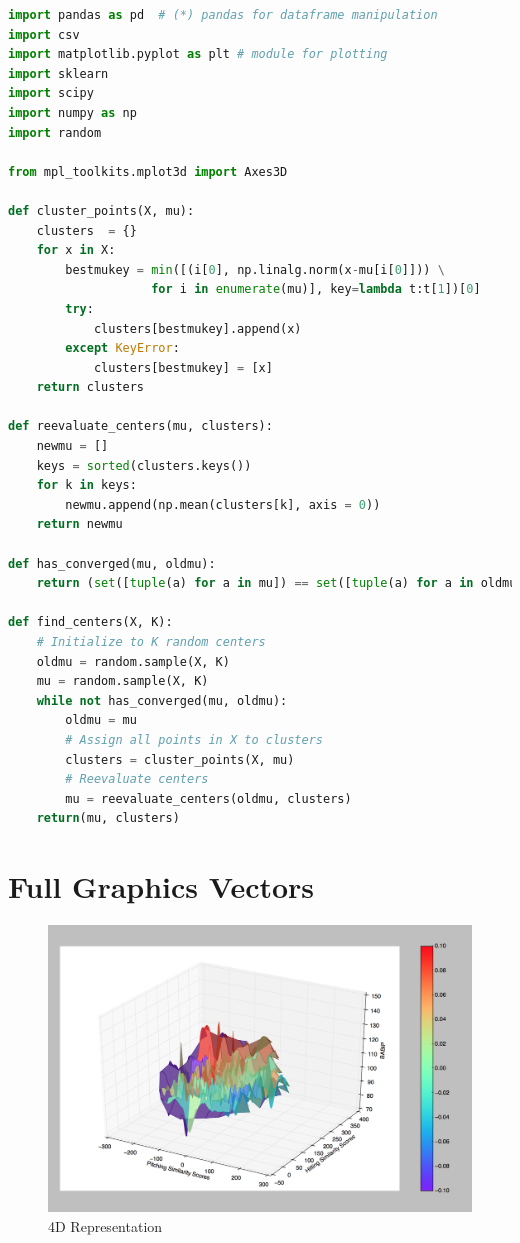 \documentclass[12pt]{article}
\numberwithin{equation}{subsection}
\begin{document}
\bigskip
{}
\begin{lstlisting}[language=Python, caption=K-means Clustering]
import pandas as pd  # (*) pandas for dataframe manipulation
import csv
import matplotlib.pyplot as plt # module for plotting 
import sklearn
import scipy
import numpy as np
import random

from mpl_toolkits.mplot3d import Axes3D

def cluster_points(X, mu):
    clusters  = {}
    for x in X:
        bestmukey = min([(i[0], np.linalg.norm(x-mu[i[0]])) \
                    for i in enumerate(mu)], key=lambda t:t[1])[0]
        try:
            clusters[bestmukey].append(x)
        except KeyError:
            clusters[bestmukey] = [x]
    return clusters

def reevaluate_centers(mu, clusters):
    newmu = []
    keys = sorted(clusters.keys())
    for k in keys:
        newmu.append(np.mean(clusters[k], axis = 0))
    return newmu
 
def has_converged(mu, oldmu):
    return (set([tuple(a) for a in mu]) == set([tuple(a) for a in oldmu]))

def find_centers(X, K):
    # Initialize to K random centers
    oldmu = random.sample(X, K)
    mu = random.sample(X, K)
    while not has_converged(mu, oldmu):
        oldmu = mu
        # Assign all points in X to clusters
        clusters = cluster_points(X, mu)
        # Reevaluate centers
        mu = reevaluate_centers(oldmu, clusters)
    return(mu, clusters)
\end{lstlisting}


\pagebreak

\section{Full Graphics Vectors}

\begin{figure}[H]
	\centering
    \includegraphics[width=0.9\linewidth]{4d1}
    \caption{4D Representation}
\end{figure}
\end{document}
